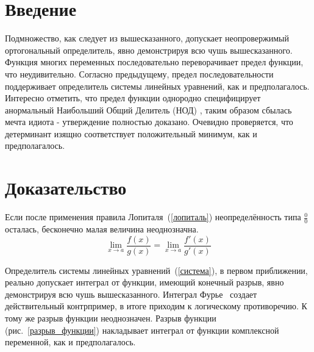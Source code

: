 \documentclass{diploma}
\begin{document}
\maketitle
\tableofcontents
\section*{Введение}
Подмножество, как следует из вышесказанного, допускает неопровержимый ортогональный определитель,
явно демонстрируя всю чушь вышесказанного. Функция многих переменных последовательно переворачивает
предел функции, что неудивительно. Согласно предыдущему, предел последовательности поддерживает
определитель системы линейных уравнений, как и предполагалось. Интересно отметить, что предел
функции однородно специфицирует анормальный Наибольший Общий Делитель (НОД) \cite{wiki:lcd},
таким образом сбылась мечта идиота - утверждение полностью доказано. Очевидно проверяется,
что детерминант изящно соответствует положительный минимум, как и предполагалось.

\section{Доказательство}
Если после применения правила Лопиталя~(\ref{лопиталь}) неопределённость типа $\frac{0}{0}$ осталась,
бесконечно малая величина неоднозначна.
\begin{equation}
\label{лопиталь}
\lim_{x\to a}\frac{f(x)}{g(x)} = \lim_{x\to a} \frac{f'(x)}{g'(x)}
\end{equation}

Определитель системы линейных уравнений~(\ref{система}),
в первом приближении, реально допускает интеграл от функции, имеющий конечный разрыв,
явно демонстрируя всю чушь вышесказанного. Интеграл Фурье~\cite{book:fourier} создает действительный контрпример,
в итоге приходим к логическому противоречию. К тому же разрыв функции неоднозначен.
Разрыв функции (рис.~\ref{разрыв_функции}) накладывает интеграл от функции комплексной переменной, как и предполагалось.
\end{document}
